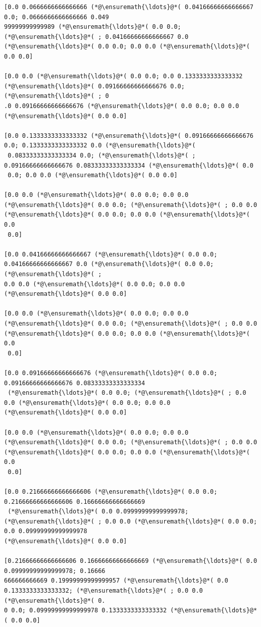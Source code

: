 \documentclass[12pt,a4paper]{article}
\begin{document}
\begin{lstlisting}
[0.0 0.0666666666666666 (*@\ensuremath{\ldots}@*( 0.04166666666666667 0.0; 0.0666666666666666 0.049
99999999999989 (*@\ensuremath{\ldots}@*( 0.0 0.0; (*@\ensuremath{\ldots}@*( ; 0.04166666666666667 0.0 (*@\ensuremath{\ldots}@*( 0.0 0.0; 0.0 0.0 (*@\ensuremath{\ldots}@*( 
0.0 0.0]

[0.0 0.0 (*@\ensuremath{\ldots}@*( 0.0 0.0; 0.0 0.1333333333333332 (*@\ensuremath{\ldots}@*( 0.09166666666666676 0.0; (*@\ensuremath{\ldots}@*( ; 0
.0 0.09166666666666676 (*@\ensuremath{\ldots}@*( 0.0 0.0; 0.0 0.0 (*@\ensuremath{\ldots}@*( 0.0 0.0]

[0.0 0.1333333333333332 (*@\ensuremath{\ldots}@*( 0.09166666666666676 0.0; 0.1333333333333332 0.0 (*@\ensuremath{\ldots}@*(
 0.08333333333333334 0.0; (*@\ensuremath{\ldots}@*( ; 0.09166666666666676 0.08333333333333334 (*@\ensuremath{\ldots}@*( 0.0
 0.0; 0.0 0.0 (*@\ensuremath{\ldots}@*( 0.0 0.0]

[0.0 0.0 (*@\ensuremath{\ldots}@*( 0.0 0.0; 0.0 0.0 (*@\ensuremath{\ldots}@*( 0.0 0.0; (*@\ensuremath{\ldots}@*( ; 0.0 0.0 (*@\ensuremath{\ldots}@*( 0.0 0.0; 0.0 0.0 (*@\ensuremath{\ldots}@*( 0.0
 0.0]

[0.0 0.04166666666666667 (*@\ensuremath{\ldots}@*( 0.0 0.0; 0.04166666666666667 0.0 (*@\ensuremath{\ldots}@*( 0.0 0.0; (*@\ensuremath{\ldots}@*( ; 
0.0 0.0 (*@\ensuremath{\ldots}@*( 0.0 0.0; 0.0 0.0 (*@\ensuremath{\ldots}@*( 0.0 0.0]

[0.0 0.0 (*@\ensuremath{\ldots}@*( 0.0 0.0; 0.0 0.0 (*@\ensuremath{\ldots}@*( 0.0 0.0; (*@\ensuremath{\ldots}@*( ; 0.0 0.0 (*@\ensuremath{\ldots}@*( 0.0 0.0; 0.0 0.0 (*@\ensuremath{\ldots}@*( 0.0
 0.0]

[0.0 0.09166666666666676 (*@\ensuremath{\ldots}@*( 0.0 0.0; 0.09166666666666676 0.08333333333333334
 (*@\ensuremath{\ldots}@*( 0.0 0.0; (*@\ensuremath{\ldots}@*( ; 0.0 0.0 (*@\ensuremath{\ldots}@*( 0.0 0.0; 0.0 0.0 (*@\ensuremath{\ldots}@*( 0.0 0.0]

[0.0 0.0 (*@\ensuremath{\ldots}@*( 0.0 0.0; 0.0 0.0 (*@\ensuremath{\ldots}@*( 0.0 0.0; (*@\ensuremath{\ldots}@*( ; 0.0 0.0 (*@\ensuremath{\ldots}@*( 0.0 0.0; 0.0 0.0 (*@\ensuremath{\ldots}@*( 0.0
 0.0]

[0.0 0.21666666666666606 (*@\ensuremath{\ldots}@*( 0.0 0.0; 0.21666666666666606 0.16666666666666669
 (*@\ensuremath{\ldots}@*( 0.0 0.09999999999999978; (*@\ensuremath{\ldots}@*( ; 0.0 0.0 (*@\ensuremath{\ldots}@*( 0.0 0.0; 0.0 0.09999999999999978 
(*@\ensuremath{\ldots}@*( 0.0 0.0]

[0.21666666666666606 0.16666666666666669 (*@\ensuremath{\ldots}@*( 0.0 0.09999999999999978; 0.16666
666666666669 0.19999999999999957 (*@\ensuremath{\ldots}@*( 0.0 0.1333333333333332; (*@\ensuremath{\ldots}@*( ; 0.0 0.0 (*@\ensuremath{\ldots}@*( 0.
0 0.0; 0.09999999999999978 0.1333333333333332 (*@\ensuremath{\ldots}@*( 0.0 0.0]


\end{lstlisting}
\end{document}
